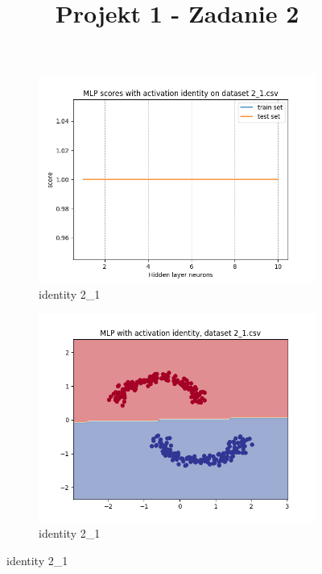 \documentclass[12pt]{article}
\title{Projekt 1 - Zadanie 2}
\newcommand*{\subfigwidth}{0.24\textwidth}
\begin{document}
\maketitle

\begin{figure}[H]\centering
    \begin{subfigure}[t]{\subfigwidth}
        \includegraphics[width=\linewidth]{img/exp_1/mlp/2_1/identity/scores.png}
        \caption{identity 2\_1}
    \end{subfigure}
    \hfill
    \begin{subfigure}[t]{\subfigwidth}
        \includegraphics[width=\linewidth]{img/exp_1/mlp/2_1/identity/boundary.png}
        \caption{identity 2\_1}

\end{subfigure}
\end{figure}
\end{document}
